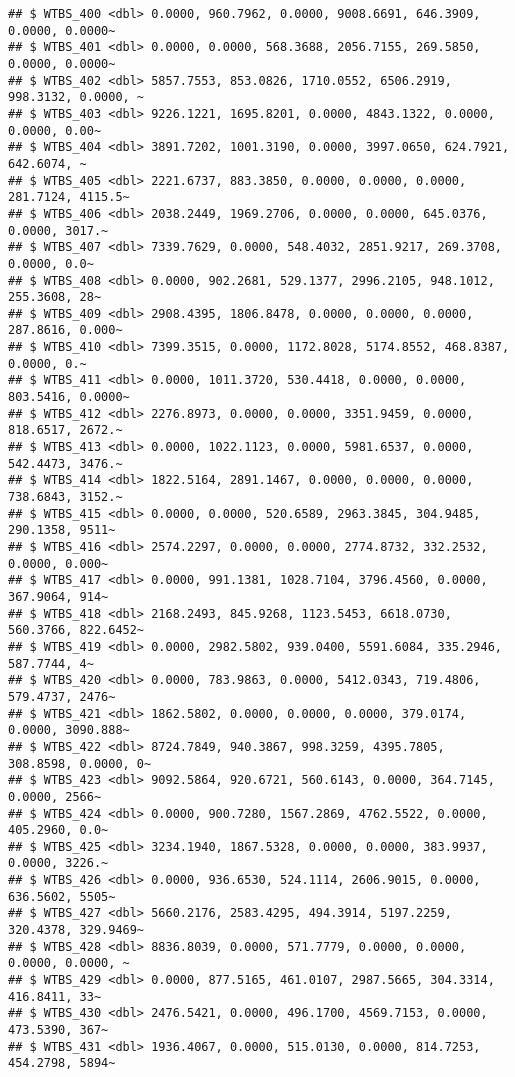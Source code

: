 \documentclass[
]{article}
\begin{document}
\begin{verbatim}
## $ WTBS_400 <dbl> 0.0000, 960.7962, 0.0000, 9008.6691, 646.3909, 0.0000, 0.0000~
## $ WTBS_401 <dbl> 0.0000, 0.0000, 568.3688, 2056.7155, 269.5850, 0.0000, 0.0000~
## $ WTBS_402 <dbl> 5857.7553, 853.0826, 1710.0552, 6506.2919, 998.3132, 0.0000, ~
## $ WTBS_403 <dbl> 9226.1221, 1695.8201, 0.0000, 4843.1322, 0.0000, 0.0000, 0.00~
## $ WTBS_404 <dbl> 3891.7202, 1001.3190, 0.0000, 3997.0650, 624.7921, 642.6074, ~
## $ WTBS_405 <dbl> 2221.6737, 883.3850, 0.0000, 0.0000, 0.0000, 281.7124, 4115.5~
## $ WTBS_406 <dbl> 2038.2449, 1969.2706, 0.0000, 0.0000, 645.0376, 0.0000, 3017.~
## $ WTBS_407 <dbl> 7339.7629, 0.0000, 548.4032, 2851.9217, 269.3708, 0.0000, 0.0~
## $ WTBS_408 <dbl> 0.0000, 902.2681, 529.1377, 2996.2105, 948.1012, 255.3608, 28~
## $ WTBS_409 <dbl> 2908.4395, 1806.8478, 0.0000, 0.0000, 0.0000, 287.8616, 0.000~
## $ WTBS_410 <dbl> 7399.3515, 0.0000, 1172.8028, 5174.8552, 468.8387, 0.0000, 0.~
## $ WTBS_411 <dbl> 0.0000, 1011.3720, 530.4418, 0.0000, 0.0000, 803.5416, 0.0000~
## $ WTBS_412 <dbl> 2276.8973, 0.0000, 0.0000, 3351.9459, 0.0000, 818.6517, 2672.~
## $ WTBS_413 <dbl> 0.0000, 1022.1123, 0.0000, 5981.6537, 0.0000, 542.4473, 3476.~
## $ WTBS_414 <dbl> 1822.5164, 2891.1467, 0.0000, 0.0000, 0.0000, 738.6843, 3152.~
## $ WTBS_415 <dbl> 0.0000, 0.0000, 520.6589, 2963.3845, 304.9485, 290.1358, 9511~
## $ WTBS_416 <dbl> 2574.2297, 0.0000, 0.0000, 2774.8732, 332.2532, 0.0000, 0.000~
## $ WTBS_417 <dbl> 0.0000, 991.1381, 1028.7104, 3796.4560, 0.0000, 367.9064, 914~
## $ WTBS_418 <dbl> 2168.2493, 845.9268, 1123.5453, 6618.0730, 560.3766, 822.6452~
## $ WTBS_419 <dbl> 0.0000, 2982.5802, 939.0400, 5591.6084, 335.2946, 587.7744, 4~
## $ WTBS_420 <dbl> 0.0000, 783.9863, 0.0000, 5412.0343, 719.4806, 579.4737, 2476~
## $ WTBS_421 <dbl> 1862.5802, 0.0000, 0.0000, 0.0000, 379.0174, 0.0000, 3090.888~
## $ WTBS_422 <dbl> 8724.7849, 940.3867, 998.3259, 4395.7805, 308.8598, 0.0000, 0~
## $ WTBS_423 <dbl> 9092.5864, 920.6721, 560.6143, 0.0000, 364.7145, 0.0000, 2566~
## $ WTBS_424 <dbl> 0.0000, 900.7280, 1567.2869, 4762.5522, 0.0000, 405.2960, 0.0~
## $ WTBS_425 <dbl> 3234.1940, 1867.5328, 0.0000, 0.0000, 383.9937, 0.0000, 3226.~
## $ WTBS_426 <dbl> 0.0000, 936.6530, 524.1114, 2606.9015, 0.0000, 636.5602, 5505~
## $ WTBS_427 <dbl> 5660.2176, 2583.4295, 494.3914, 5197.2259, 320.4378, 329.9469~
## $ WTBS_428 <dbl> 8836.8039, 0.0000, 571.7779, 0.0000, 0.0000, 0.0000, 0.0000, ~
## $ WTBS_429 <dbl> 0.0000, 877.5165, 461.0107, 2987.5665, 304.3314, 416.8411, 33~
## $ WTBS_430 <dbl> 2476.5421, 0.0000, 496.1700, 4569.7153, 0.0000, 473.5390, 367~
## $ WTBS_431 <dbl> 1936.4067, 0.0000, 515.0130, 0.0000, 814.7253, 454.2798, 5894~

\end{verbatim}
\end{document}
